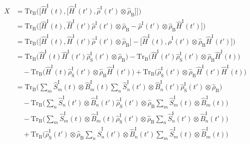 \documentclass[9pt]{report}
\begin{document}
\begin{align}
X &= \mathrm{Tr}_{\mathrm{B}}\Big(\big[\hat{H}^{\mathrm{I}}(t),\big[\hat{H}^{\mathrm{I}}(t'),\hat{\rho}^{\mathrm{I}}(t')\otimes\hat{\rho}_{\mathrm{B}}\big]\big]\Big)\\
&= \mathrm{Tr}_{\mathrm{B}}\Big(\big[\hat{H}^{\mathrm{I}}(t),\hat{H}^{\mathrm{I}}(t')\hat{\rho}^{\mathrm{I}}(t')\otimes\hat{\rho}_{\mathrm{B}}-\hat{\rho}^{\mathrm{I}}(t')\otimes\hat{\rho}_{\mathrm{B}}\hat{H}^{\mathrm{I}}(t')\big]\Big)\\
&= \mathrm{Tr}_{\mathrm{B}}\Big(\big[\hat{H}^{\mathrm{I}}(t),\hat{H}^{\mathrm{I}}(t')\hat{\rho}^{\mathrm{I}}(t')\otimes\hat{\rho}_{\mathrm{B}}\big]-\big[\hat{H}^{\mathrm{I}}(t),\hat{\rho}^{\mathrm{I}}(t')\otimes\hat{\rho}_{\mathrm{B}}\hat{H}^{\mathrm{I}}(t')\big]\Big)\\
&= \mathrm{Tr}_{\mathrm{B}}\big(\hat{H}^{\mathrm{I}}(t)\hat{H}^{\mathrm{I}}(t')\hat{\rho}_{\mathrm{S}}^{\mathrm{I}}(t')\otimes\hat{\rho}_{\mathrm{B}}\big)-\mathrm{Tr}_{\mathrm{B}}\big(\hat{H}^{\mathrm{I}}(t')\hat{\rho}_{\mathrm{S}}^{\mathrm{I}}(t')\otimes\hat{\rho}_{\mathrm{B}}\hat{H}^{\mathrm{I}}(t)\big)\\
&\quad-\mathrm{Tr}_{\mathrm{B}}\big(\hat{H}^{\mathrm{I}}(t)\hat{\rho}_{\mathrm{S}}^{\mathrm{I}}(t')\otimes\hat{\rho}_{\mathrm{B}}\hat{H}^{\mathrm{I}}(t')\big)+\mathrm{Tr}_{\mathrm{B}}\big(\hat{\rho}_{\mathrm{S}}^{\mathrm{I}}(t')\otimes\hat{\rho}_{\mathrm{B}}\hat{H}^{\mathrm{I}}(t')\hat{H}^{\mathrm{I}}(t)\big)\\
&= \mathrm{Tr}_{\mathrm{B}}\Big(\sum_{m}\hat{S}_{m}^{\mathrm{I}}(t)\otimes\hat{B}_{m}^{\mathrm{I}}(t)\sum_{n}\hat{S}_{n}^{\mathrm{I}}(t')\otimes\hat{B}_{n}^{\mathrm{I}}(t')\hat{\rho}_{\mathrm{S}}^{\mathrm{I}}(t')\otimes\hat{\rho}_{\mathrm{B}}\Big)\\
&\quad-\mathrm{Tr}_{\mathrm{B}}\Big(\sum_{n}\hat{S}_{n}^{\mathrm{I}}(t')\otimes\hat{B}_{n}^{\mathrm{I}}(t')\hat{\rho}_{\mathrm{S}}^{\mathrm{I}}(t')\otimes\hat{\rho}_{\mathrm{B}}\sum_{m}\hat{S}_{m}^{\mathrm{I}}(t)\otimes\hat{B}_{m}^{\mathrm{I}}(t)\Big)\\
&\quad-\mathrm{Tr}_{\mathrm{B}}\Big(\sum_{m}\hat{S}_{m}^{\mathrm{I}}(t)\otimes\hat{B}_{m}^{\mathrm{I}}(t)\hat{\rho}_{\mathrm{S}}^{\mathrm{I}}(t')\otimes\hat{\rho}_{\mathrm{B}}\sum_{n}\hat{S}_{n}^{\mathrm{I}}(t')\otimes\hat{B}_{n}^{\mathrm{I}}(t')\Big)\\
&\quad+\mathrm{Tr}_{\mathrm{B}}\Big(\hat{\rho}_{\mathrm{S}}^{\mathrm{I}}(t')\otimes\hat{\rho}_{\mathrm{B}}\sum_{n}\hat{S}_{n}^{\mathrm{I}}(t')\otimes\hat{B}_{n}^{\mathrm{I}}(t')\sum_{m}\hat{S}_{m}^{\mathrm{I}}(t)\otimes\hat{B}_{m}^{\mathrm{I}}(t)\Big)\\

\end{align}
\end{document}
